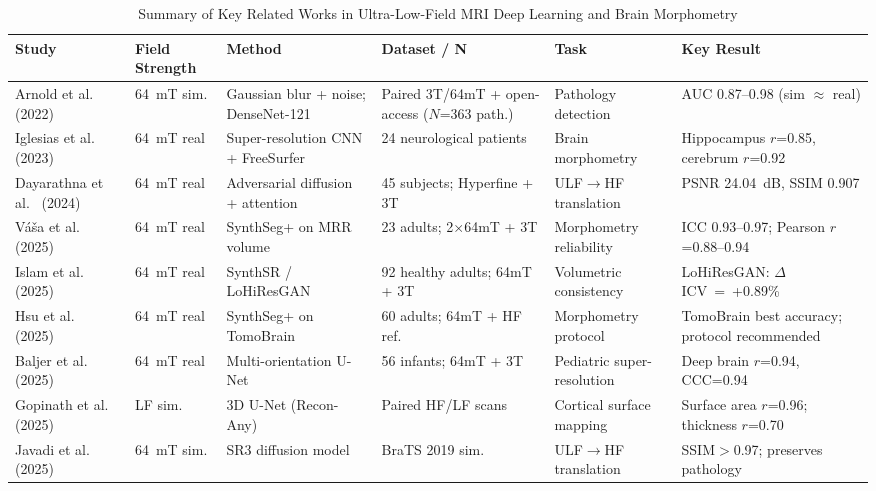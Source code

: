 
\begin{table}[!t]
\caption{Summary of Key Related Works in Ultra-Low-Field MRI Deep Learning and Brain Morphometry}
\label{tab:litcomparison}
\centering
\small
\begin{tabular}{|p{3.2cm}|p{1.4cm}|p{2.2cm}|p{2.4cm}|p{2.4cm}|p{2.6cm}|}
\hline
\textbf{Study} & \textbf{Field Strength} & \textbf{Method} & \textbf{Dataset / N} & \textbf{Task} & \textbf{Key Result} \\
\hline
Arnold et al.~\cite{arnold2022simulated} (2022) & 64~mT sim. & Gaussian blur + noise; DenseNet-121 & Paired 3T/64mT + open-access ($N$=363 path.) & Pathology detection & AUC 0.87--0.98 (sim $\approx$ real) \\
\hline
Iglesias et al.~\cite{iglesias2023radiology} (2023) & 64~mT real & Super-resolution CNN + FreeSurfer & 24 neurological patients & Brain morphometry & Hippocampus $r$=0.85, cerebrum $r$=0.92 \\
\hline
Dayarathna et al.~\cite{dayarathna2024adversarial} (2024) & 64~mT real & Adversarial diffusion + attention & 45 subjects; Hyperfine + 3T & ULF$\to$HF translation & PSNR 24.04~dB, SSIM 0.907 \\
\hline
V\'{a}\v{s}a et al.~\cite{vasa2025morphometry} (2025) & 64~mT real & SynthSeg+ on MRR volume & 23 adults; 2$\times$64mT + 3T & Morphometry reliability & ICC 0.93--0.97; Pearson $r$=0.88--0.94 \\
\hline
Islam et al.~\cite{islam2025volumetric} (2025) & 64~mT real & SynthSR / LoHiResGAN & 92 healthy adults; 64mT + 3T & Volumetric consistency & LoHiResGAN: $\Delta$ICV~=~+0.89\% \\
\hline
Hsu et al.~\cite{hsu2025morphological} (2025) & 64~mT real & SynthSeg+ on TomoBrain & 60 adults; 64mT + HF ref. & Morphometry protocol & TomoBrain best accuracy; protocol recommended \\
\hline
Baljer et al.~\cite{baljer2025pediatricsr} (2025) & 64~mT real & Multi-orientation U-Net & 56 infants; 64mT + 3T & Pediatric super-resolution & Deep brain $r$=0.94, CCC=0.94 \\
\hline
Gopinath et al.~\cite{gopinath2025reconany} (2025) & LF sim. & 3D U-Net (Recon-Any) & Paired HF/LF scans & Cortical surface mapping & Surface area $r$=0.96; thickness $r$=0.70 \\
\hline
Javadi et al.~\cite{javadi2025diffusion} (2025) & 64~mT sim. & SR3 diffusion model & BraTS 2019 sim. & ULF$\to$HF translation & SSIM$>$0.97; preserves pathology \\

\end{tabular}
\end{table}
